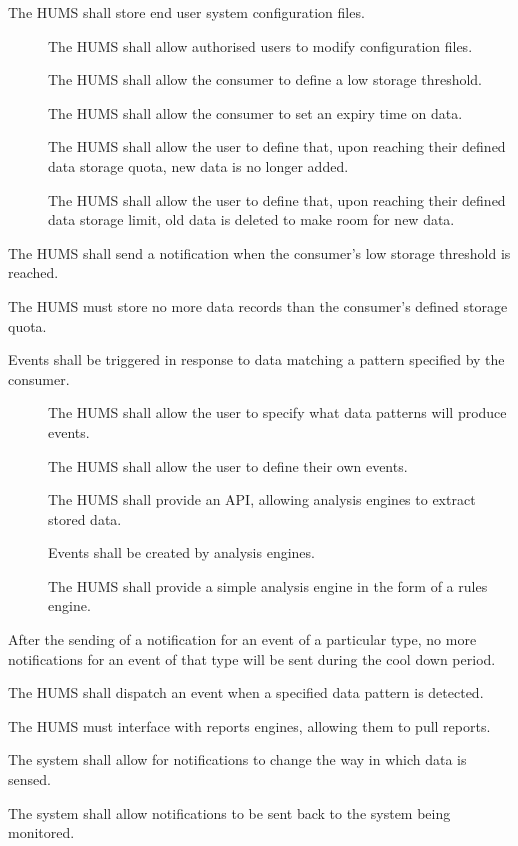 \begin{description}
\begin{description}
	  \end{description}
	 \item[\fr{4}] The HUMS shall store end user system configuration 
			files.
	 \begin{description}
	  	\item[] The HUMS shall allow authorised users to modify
 		configuration files. 
		 \item[] The HUMS shall allow the consumer to define a 	
			low storage threshold.
		  \item[] The HUMS shall allow the consumer to set an 
			expiry time on data.
		  \item[] The HUMS shall allow the user to define that, 
			upon reaching their defined data storage quota, new data is 
			no longer added.
		 \item[] The HUMS shall allow the user to define that, 
			upon reaching their defined data storage limit, old data is 
			deleted to make room for new data.
	\end{description}
	 \item[\fr{5}] The HUMS shall send a notification when the consumer's 
		low storage threshold is reached.
	  \item[\fr{6}] The HUMS must store no more data records than the 	
		consumer's defined storage quota.
	\item[\fr{7}]Events shall be triggered in response to data matching a pattern 
	specified by the consumer.
		  \begin{description}
			 \item[]  The HUMS shall allow the user to specify 	
			what data patterns will produce events.
			 \item[] The HUMS shall allow the user to define their
 			own events.
 			\item[] The HUMS shall provide an API, 			
			allowing analysis engines to extract stored data.
			\item[] Events shall be created by analysis engines.
 			\item[] The HUMS shall provide a simple analysis 	
			engine in the form of a rules engine.
	\end{description}
	
	\item[\fr{8}]After the sending of a notification for an event of a particular 
		type, no more notifications for an event of that type will be 	
		sent during the cool down period.
	\item[\fr{9}]The HUMS shall dispatch an event when a specified data 
		pattern is detected.
	\item[\fr{10}] The HUMS must interface with reports engines, allowing 
		them to pull reports.
	\item[\fr{11}] The system shall allow for notifications to change the way 
		in which data is sensed.
	 \item[\fr{12}] The system shall allow notifications to be sent back to 
		the system being monitored.
\end{description}

